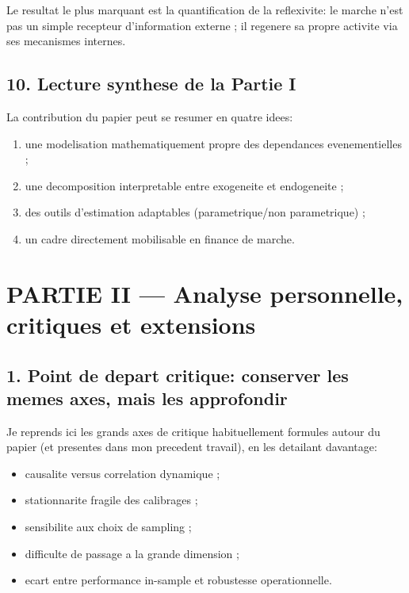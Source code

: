 \documentclass[11pt,a4paper]{article}
\begin{document}
Le resultat le plus marquant est la quantification de la reflexivite: le marche n'est pas un simple recepteur d'information externe ; il regenere sa propre activite via ses mecanismes internes.

\subsection*{10. Lecture synthese de la Partie I}

La contribution du papier peut se resumer en quatre idees:
\begin{enumerate}[leftmargin=1.2cm]
    \item une modelisation mathematiquement propre des dependances evenementielles ;
    \item une decomposition interpretable entre exogeneite et endogeneite ;
    \item des outils d'estimation adaptables (parametrique/non parametrique) ;
    \item un cadre directement mobilisable en finance de marche.
\end{enumerate}

\newpage
\section*{PARTIE II --- Analyse personnelle, critiques et extensions}

\subsection*{1. Point de depart critique: conserver les memes axes, mais les approfondir}

Je reprends ici les grands axes de critique habituellement formules autour du papier (et presentes dans mon precedent travail), en les detailant davantage:
\begin{itemize}[leftmargin=1.2cm]
    \item causalite versus correlation dynamique ;
    \item stationnarite fragile des calibrages ;
    \item sensibilite aux choix de sampling ;
    \item difficulte de passage a la grande dimension ;
    \item ecart entre performance in-sample et robustesse operationnelle.
\end{itemize}
\end{document}
